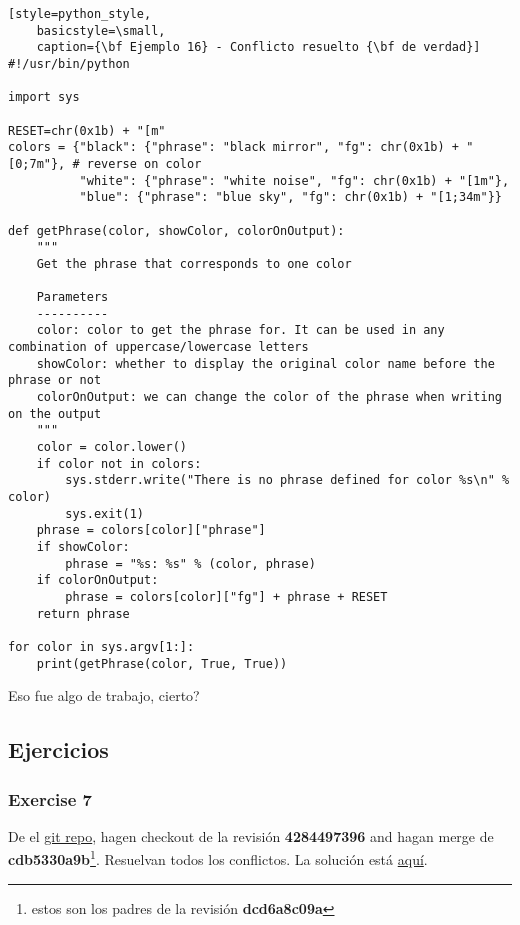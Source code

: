 \begin{lstlisting}[style=python_style,
	basicstyle=\small,
	caption={\bf Ejemplo 16} - Conflicto resuelto {\bf de verdad}]
#!/usr/bin/python

import sys

RESET=chr(0x1b) + "[m"
colors = {"black": {"phrase": "black mirror", "fg": chr(0x1b) + "[0;7m"}, # reverse on color
          "white": {"phrase": "white noise", "fg": chr(0x1b) + "[1m"},
          "blue": {"phrase": "blue sky", "fg": chr(0x1b) + "[1;34m"}}

def getPhrase(color, showColor, colorOnOutput):
    """
    Get the phrase that corresponds to one color
    
    Parameters
    ----------
    color: color to get the phrase for. It can be used in any combination of uppercase/lowercase letters
    showColor: whether to display the original color name before the phrase or not
    colorOnOutput: we can change the color of the phrase when writing on the output
    """
    color = color.lower()
    if color not in colors:
        sys.stderr.write("There is no phrase defined for color %s\n" % color)
        sys.exit(1)
    phrase = colors[color]["phrase"]
    if showColor:
        phrase = "%s: %s" % (color, phrase)
    if colorOnOutput:
        phrase = colors[color]["fg"] + phrase + RESET
    return phrase

for color in sys.argv[1:]:
    print(getPhrase(color, True, True))
\end{lstlisting}

Eso fue algo de trabajo, cierto?

\subsection{Ejercicios}

\subsubsection{Exercise 7}

De el \hyperref[git_repo]{git repo}, hagen checkout de la revisión {\bf 4284497396} and hagan merge de {\bf cdb5330a9b}\footnote{estos son
los padres de la revisión {\bf dcd6a8c09a}}. Resuelvan todos los conflictos. La solución está \hyperref[exercise_07]{aquí}.

